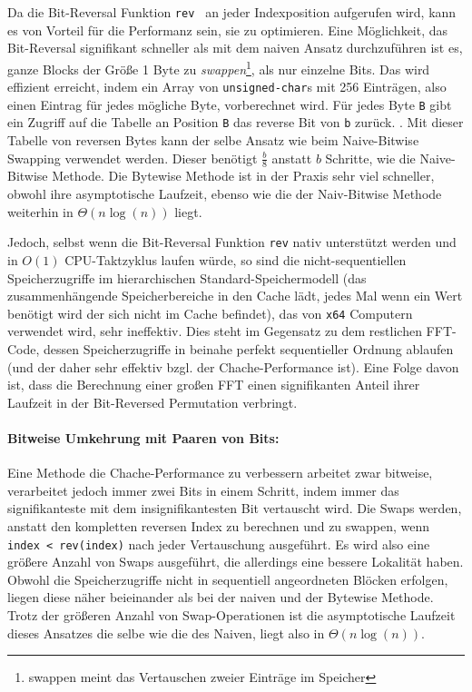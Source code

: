 \documentclass[10pt]{article}
\begin{document}
Da die Bit-Reversal Funktion {\tt rev } an jeder Indexposition aufgerufen wird,
kann es von Vorteil für die Performanz sein, sie zu optimieren. Eine Möglichkeit, 
das Bit-Reversal signifikant schneller als mit dem naiven Ansatz durchzuführen ist es, 
ganze Blocks der Größe 1 Byte zu {\it swappen}\footnote{swappen meint das Vertauschen zweier Einträge im Speicher}, 
als nur einzelne Bits. Das wird effizient erreicht,
indem ein Array von {\tt unsigned-char}s mit 256 Einträgen, also einen Eintrag für jedes mögliche Byte,
vorberechnet wird. Für jedes Byte {\tt B} gibt ein Zugriff auf die Tabelle an Position {\tt B} das reverse Bit
von {\tt b} zurück. \cite{j:best,anderson:bit}. 
Mit dieser Tabelle von reversen Bytes kann der selbe Ansatz wie beim Naive-Bitwise Swapping
verwendet werden. Dieser benötigt $\frac{b}{8}$ anstatt $b$ Schritte, wie die Naive-Bitwise Methode.
Die Bytewise Methode ist in der Praxis sehr viel schneller, obwohl ihre asymptotische Laufzeit, 
ebenso wie die der Naiv-Bitwise Methode weiterhin in $\Theta(n\log(n))$ liegt.

Jedoch, selbst wenn die Bit-Reversal Funktion {\tt rev} nativ unterstützt werden 
und in $O(1)$ CPU-Taktzyklus laufen würde, so sind die nicht-sequentiellen Speicherzugriffe
im hierarchischen Standard-Speichermodell (das zusammenhängende Speicherbereiche in den Cache lädt, 
jedes Mal wenn ein Wert benötigt wird der sich nicht im Cache befindet), das von {\tt x64} Computern 
verwendet wird, sehr ineffektiv. Dies steht im Gegensatz zu dem restlichen FFT-Code, dessen Speicherzugriffe 
in beinahe perfekt sequentieller Ordnung ablaufen (und der daher sehr effektiv bzgl. der 
Chache-Performance ist). Eine Folge davon ist, dass die Berechnung einer großen FFT einen signifikanten
Anteil ihrer Laufzeit in der Bit-Reversed Permutation verbringt.

\paragraph{Bitweise Umkehrung mit Paaren von Bits:}

Eine Methode die Chache-Performance zu verbessern arbeitet zwar bitweise, 
verarbeitet jedoch immer zwei Bits in einem Schritt, indem immer das signifikanteste mit 
dem insignifikantesten Bit vertauscht wird.
Die Swaps werden, anstatt den kompletten reversen Index zu berechnen und zu swappen, wenn {\tt index < rev(index)}
nach jeder Vertauschung ausgeführt. Es wird also eine größere Anzahl von Swaps ausgeführt, die allerdings 
eine bessere Lokalität haben. Obwohl die Speicherzugriffe nicht in sequentiell angeordneten Blöcken erfolgen, 
liegen diese näher beieinander als bei der naiven und der Bytewise Methode. Trotz der größeren Anzahl von 
Swap-Operationen ist die asymptotische Laufzeit dieses Ansatzes die selbe wie die des Naiven, 
liegt also in $\Theta(n \log(n))$.
\end{document}
